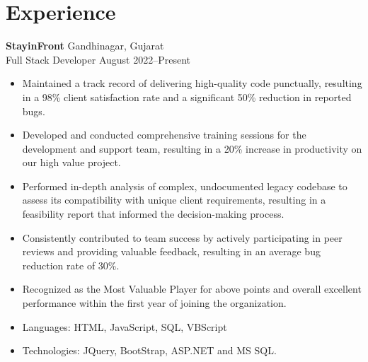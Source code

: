 \documentclass[a4paper,10pt]{article}
\begin{document}
\section{Experience}
\noindent
\textbf{StayinFront} \hfill Gandhinagar, Gujarat \\
Full Stack Developer \hfill August 2022--Present \
\begin{itemize}
    \setlength\itemsep{0.1pt}
    \item Maintained a track record of delivering high-quality code punctually, resulting in a 98\% client satisfaction rate and a significant 50\% reduction in reported bugs.
    \item Developed and conducted comprehensive training sessions for the development and support team, resulting in a 20\% increase in productivity on our high value project.
    \item Performed in-depth analysis of complex, undocumented legacy codebase to assess its compatibility with unique client requirements, resulting in a feasibility report that informed the decision-making process.
    \item Consistently contributed to team success by actively participating in peer reviews and providing valuable feedback, resulting in an average bug reduction rate of 30\%.
    \item Recognized as the Most Valuable Player for above points and overall excellent performance within the first year of joining the organization.
    \item Languages: HTML, JavaScript, SQL, VBScript
    \item Technologies: JQuery, BootStrap, ASP.NET and MS SQL\@.
\end{itemize}

\end{document}
